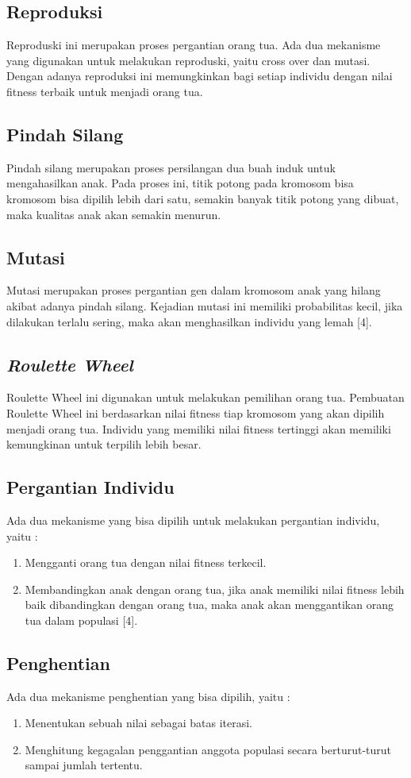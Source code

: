 \documentclass[12pt,a4paper,oneside,titlepage]{report}
\begin{document}
		\subsection{Reproduksi}
		Reproduski ini merupakan proses pergantian orang tua. Ada dua mekanisme yang digunakan untuk melakukan reproduski, yaitu cross over dan mutasi. Dengan adanya reproduksi ini memungkinkan bagi setiap individu dengan nilai fitness terbaik untuk menjadi orang tua.
		\subsection{Pindah Silang}
		Pindah silang merupakan proses persilangan dua buah induk untuk mengahasilkan anak. Pada proses ini, titik potong pada kromosom bisa kromosom bisa dipilih lebih dari satu, semakin banyak titik potong yang dibuat, maka kualitas anak akan semakin menurun.
		\subsection{Mutasi}
		Mutasi merupakan proses pergantian gen dalam kromosom anak yang hilang akibat adanya pindah silang. Kejadian mutasi ini memiliki probabilitas kecil, jika dilakukan terlalu sering, maka akan menghasilkan individu yang lemah [4].
		\subsection{\emph{Roulette Wheel}}
		Roulette Wheel ini digunakan untuk melakukan pemilihan orang tua. Pembuatan Roulette Wheel ini berdasarkan nilai fitness tiap kromosom yang akan dipilih menjadi orang tua. Individu yang memiliki nilai fitness tertinggi akan memiliki kemungkinan untuk terpilih lebih besar.
		\subsection{Pergantian Individu}
		Ada dua mekanisme yang bisa dipilih untuk melakukan pergantian individu, yaitu : 
		\begin{enumerate}
			\item Mengganti orang tua dengan nilai fitness terkecil.
			
			\item Membandingkan anak dengan orang tua, jika anak memiliki nilai fitness lebih baik dibandingkan dengan orang tua, maka anak akan menggantikan orang tua dalam populasi [4].
		\end{enumerate}
		
		
		\subsection{Penghentian}
		Ada dua mekanisme penghentian yang bisa dipilih, yaitu :	
		\begin{enumerate}
			\item Menentukan sebuah nilai sebagai batas iterasi.
			
			\item Menghitung kegagalan penggantian anggota populasi secara berturut-turut sampai jumlah tertentu.
		\end{enumerate}
		\newpage
		
\end{document}
